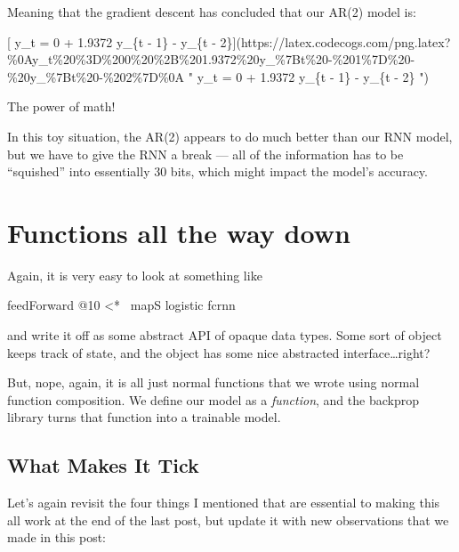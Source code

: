 \documentclass[]{article}
\newenvironment{Shaded}{}{}
\newcommand{\DecValTok}[1]{\textcolor[rgb]{0.25,0.63,0.44}{#1}}
\newcommand{\FunctionTok}[1]{\textcolor[rgb]{0.02,0.16,0.49}{#1}}
\newcommand{\NormalTok}[1]{#1}
\begin{document}
Meaning that the gradient descent has concluded that our AR(2) model is:

{[} y\_t = 0 + 1.9372 y\_\{t - 1\} - y\_\{t -
2\}{]}(https://latex.codecogs.com/png.latex?\%0Ay\_t\%20\%3D\%200\%20\%2B\%201.9372\%20y\_\%7Bt\%20-\%201\%7D\%20-\%20y\_\%7Bt\%20-\%202\%7D\%0A
" y\_t = 0 + 1.9372 y\_\{t - 1\} - y\_\{t - 2\} ")

The power of math!

In this toy situation, the AR(2) appears to do much better than our RNN model,
but we have to give the RNN a break --- all of the information has to be
``squished'' into essentially 30 bits, which might impact the model's accuracy.

\hypertarget{functions-all-the-way-down}{%
\section{Functions all the way down}\label{functions-all-the-way-down}}

Again, it is very easy to look at something like

\begin{Shaded}
\begin{Highlighting}[]
\NormalTok{feedForward }\FunctionTok{@}\DecValTok{10} \FunctionTok{<*~}\NormalTok{ mapS logistic fcrnn}
\end{Highlighting}
\end{Shaded}

and write it off as some abstract API of opaque data types. Some sort of object
keeps track of state, and the object has some nice abstracted
interface\ldots{}right?

But, nope, again, it is all just normal functions that we wrote using normal
function composition. We define our model as a \emph{function}, and the backprop
library turns that function into a trainable model.

\hypertarget{what-makes-it-tick}{%
\subsection{What Makes It Tick}\label{what-makes-it-tick}}

Let's again revisit the four things I mentioned that are essential to making
this all work at the end of the last post, but update it with new observations
that we made in this post:
\end{document}
